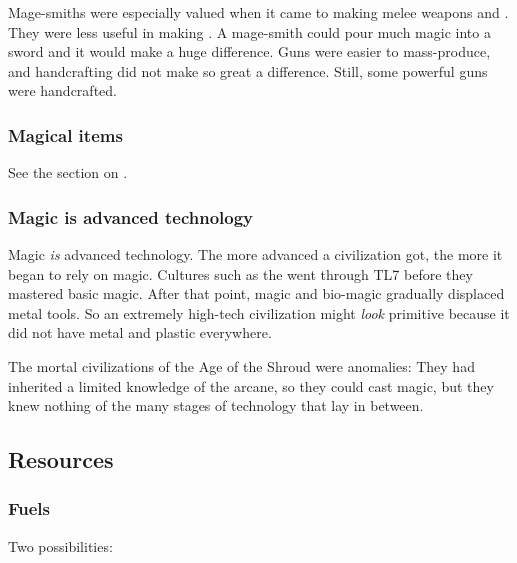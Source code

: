 Mage-smiths were especially valued when it came to making melee weapons and \armour. 
They were less useful in making . 
A mage-smith could pour much magic into a sword and it would make a huge difference.
Guns were easier to mass-produce, and handcrafting did not make so great a difference.
Still, some powerful guns were handcrafted.





\subsubsection{Magical items}
See the section on . 









\subsubsection{Magic is advanced technology}
Magic \emph{is} advanced technology. 
The more advanced a civilization got, the more it began to rely on magic. 
Cultures such as the \ophidians went through TL7 before they mastered basic magic.
After that point, magic and bio-magic gradually displaced metal tools.
So an extremely high-tech civilization might \emph{look} primitive because it did not have metal and plastic everywhere. 

The mortal civilizations of the Age of the Shroud were anomalies:
They had inherited a limited knowledge of the arcane, so they could cast magic, but they knew nothing of the many stages of technology that lay in between.










\subsection{Resources}





\subsubsection{Fuels}
Two possibilities:

